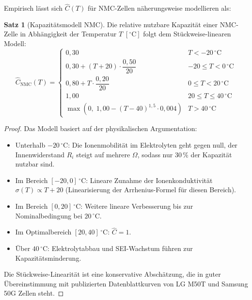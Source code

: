 ﻿\documentclass[a4paper,12pt]{article}
\theoremstyle{definition}
\newtheorem{satz}{Satz}
\begin{document}
Empirisch l\"asst sich $\hat{C}(T)$ f\"ur NMC-Zellen n\"aherungsweise modellieren als:

\begin{satz}[Kapazit\"atsmodell NMC]
\label{satz:kap}
Die relative nutzbare Kapazit\"at einer NMC-Zelle in Abh\"angigkeit der Temperatur $T\;[{}^\circ\mathrm{C}]$ folgt dem St\"uckweise-linearen Modell:
\[
  \hat{C}_\mathrm{NMC}(T) = \begin{cases}
    0{,}30 & T < -20\,{}^\circ\mathrm{C} \\
    0{,}30 + (T + 20)\cdot\dfrac{0{,}50}{20} & -20 \leq T < 0\,{}^\circ\mathrm{C} \\
    0{,}80 + T\cdot\dfrac{0{,}20}{20} & 0 \leq T < 20\,{}^\circ\mathrm{C} \\
    1{,}00 & 20 \leq T \leq 40\,{}^\circ\mathrm{C} \\
    \max\!\left(0,\;1{,}00 - (T-40)^{1{,}5}\cdot 0{,}004\right) & T > 40\,{}^\circ\mathrm{C}
  \end{cases}
\]
\end{satz}

\begin{proof}
Das Modell basiert auf der physikalischen Argumentation:
\begin{itemize}
  \item Unterhalb $-20\,{}^\circ\mathrm{C}$: Die Ionenmobilit\"at im Elektrolyten geht gegen null, der Innenwiderstand $R_i$ steigt auf mehrere $\Omega$, sodass nur $30\,\%$ der Kapazit\"at nutzbar sind.
  \item Im Bereich $[-20, 0]\,{}^\circ\mathrm{C}$: Lineare Zunahme der Ionenkonduktivit\"at $\sigma(T) \propto T + 20$ (Linearisierung der Arrhenius-Formel f\"ur diesen Bereich).
  \item Im Bereich $[0, 20]\,{}^\circ\mathrm{C}$: Weitere lineare Verbesserung bis zur Nominalbedingung bei $20\,{}^\circ\mathrm{C}$.
  \item Im Optimalbereich $[20, 40]\,{}^\circ\mathrm{C}$: $\hat{C} = 1$.
  \item \"Uber $40\,{}^\circ\mathrm{C}$: Elektrolytabbau und SEI-Wachstum f\"uhren zur Kapazit\"atsminderung.
\end{itemize}
Die St\"uckweise-Linearit\"at ist eine konservative Absch\"atzung, die in guter \"Ubereinstimmung mit publizierten Datenblattkurven von LG M50T und Samsung 50G Zellen steht.
\end{proof}
\end{document}
